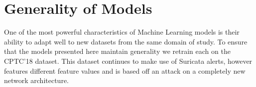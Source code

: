 \section{Generality of Models}
\label{sec:cptc18}

One of the most powerful characteristics of Machine Learning models is their ability to adapt well to new datasets from the same domain of study. To ensure that the models presented here maintain generality we retrain each on the CPTC'18 dataset. This dataset continues to make use of Suricata alerts, however features different feature values and is based off an attack on a completely new network architecture.
